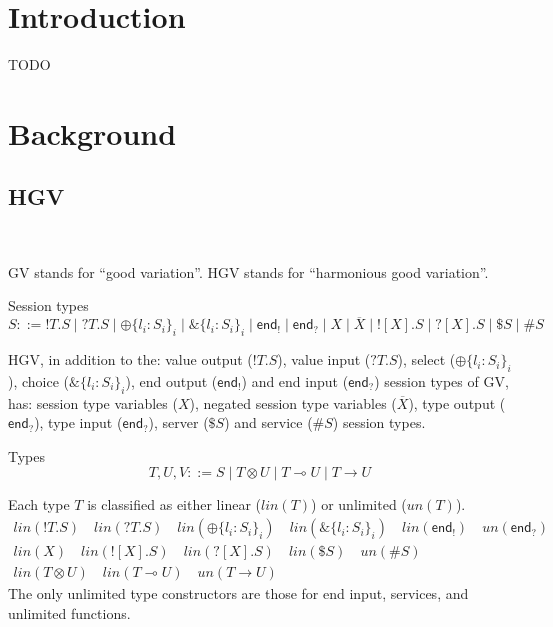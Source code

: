 \documentclass{easychair}
\newcommand{\key}{\mathsf}
\newcommand{\set}[1]{\{ #1 \}}
\newcommand{\row}[2]{\set{#1}_{#2}}
\newcommand{\gvOutput}[2]{!{#1}.{#2}}
\newcommand{\gvInput}[2]{?{#1}.{#2}}
\newcommand{\gvEndOutput}{\key{end}_!}
\newcommand{\gvEndInput}{\key{end}_?}
\newcommand{\gvPlus}[2]{\oplus \row{#1}{#2}}
\newcommand{\gvChoice}[2]{\binampersand \row{#1}{#2}}
\newcommand{\gvServer}[1]{\${#1}}
\newcommand{\gvService}[1]{\#{#1}}
\newcommand{\gvDual}[1]{\overline{#1}}
\newcommand{\gvOutputType}[2]{![{#1}].{#2}}
\newcommand{\gvInputType}[2]{?[{#1}].{#2}}
\newcommand{\la}{l}
\newcommand{\lolli}{\multimap}
\newcommand{\gvLinFun}[2]{{#1} \lolli {#2}}
\newcommand{\gvUnFun}[2]{{#1} \to {#2}}
\newcommand{\gvTimes}[2]{{#1} \otimes {#2}}
\newcommand{\un}[1]{\mathit{un}(#1)}
\newcommand{\lin}[1]{\mathit{lin}(#1)}
\newcommand{\hgv}{HGV\xspace}
\begin{document}
%
%



\section{Introduction}
TODO

\section{Background}


\subsection{\hgv}
~

GV stands for ``good variation''. \hgv stands for ``harmonious good
variation''.

Session types
\[
S ::= \gvOutput{T}{S} \mid \gvInput{T}{S} \mid 
      \gvPlus{\la_i:S_i}{i} \mid \gvChoice{\la_i:S_i}{i} \mid
      \gvEndOutput \mid \gvEndInput \mid
      X \mid \gvDual{X} \mid
      \gvOutputType{X}{S} \mid \gvInputType{X}{S} \mid
      \gvServer{S} \mid \gvService{S}
\]

\hgv, in addition to the: value output ($\gvOutput{T}{S}$), value input
($\gvInput{T}{S}$), select ($\gvPlus{\la_i:S_i}{i}$), choice
($\gvChoice{\la_i:S_i}{i}$), end output ($\gvEndOutput$) and end input
($\gvEndInput$) session types of GV, has: session type variables
($X$), negated session type variables ($\gvDual{X}$), type output
($\gvEndInput$), type input ($\gvEndInput$), server ($\gvServer{S}$)
and service ($\gvService{S}$) session types.


Types
\[
T,U,V ::= S \mid \gvTimes{T}{U} \mid \gvLinFun{T}{U} \mid \gvUnFun{T}{U}
\]

Each type $T$ is classified as either linear ($\lin{T}$) or unlimited
($\un{T}$).
\[
\begin{array}{l}
\lin{\gvOutput{T}{S}}  \quad \lin{\gvInput{T}{S}} \quad
\lin{\gvPlus{\la_i:S_i}{i}} \quad \lin{\gvChoice{\la_i:S_i}{i}} \quad
\lin{\gvEndOutput} \quad \un{\gvEndInput} \\
\lin{X} \quad
\lin{\gvOutputType{X}{S}} \quad \lin{\gvInputType{X}{S}} \quad
\lin{\gvServer{S}} \quad \un{\gvService{S}} \\
\lin{\gvTimes{T}{U}} \quad \lin{\gvLinFun{T}{U}} \quad \un{\gvUnFun{T}{U}}
\end{array}
\]
The only unlimited type constructors are those for end input,
services, and unlimited functions.
\end{document}

